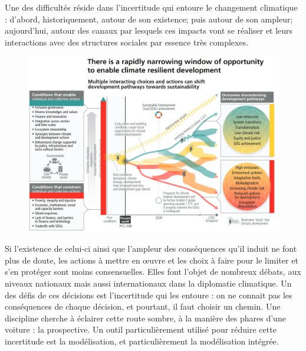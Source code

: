 Une des difficultés réside dans l'incertitude qui entoure le changement climatique : d'abord, historiquement, autour de son existence; puis autour de son ampleur; aujourd'hui, autour des canaux par lesquels ces impacts vont se réaliser et leurs interactions avec des structures sociales par essence très complexes. 

\begin{figure}[h]
    \centering
    \includegraphics[width=\linewidth]{figures/trajectoire_spm6.png}
    \label{fig:pathways}
\end{figure}

Si l'existence de celui-ci ainsi que l'ampleur des conséquences qu'il induit ne font plus de doute, les actions à mettre en œuvre et les choix à faire pour le limiter et s'en protéger sont moins consensuelles. Elles font l'objet de nombreux débats, aux niveaux nationaux mais aussi internationaux dans la diplomatie climatique. Un des défis de ces décisions est l'incertitude qui les entoure : on ne connait pas les conséquences de chaque décision, et pourtant, il faut choisir un chemin. Une discipline cherche à éclairer cette route sombre, à la manière des phares d'une voiture : la prospective. Un outil particulièrement utilisé pour réduire cette incertitude est la modélisation, et particulièrement la modélisation intégrée. \\


